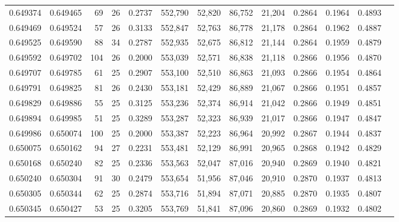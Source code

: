 \begin{tabular}{rrrrrrrrrrrrr}
0.649374 & 0.649465 &  69 &  26 &                                     0.2737 & 552,790 &  52,820 &  86,752 &  21,204 & 0.2864 & 0.1964 & 0.4893 \\
0.649469 & 0.649524 &  57 &  26 &                                     0.3133 & 552,847 &  52,763 &  86,778 &  21,178 & 0.2864 & 0.1962 & 0.4887 \\
0.649525 & 0.649590 &  88 &  34 &                                     0.2787 & 552,935 &  52,675 &  86,812 &  21,144 & 0.2864 & 0.1959 & 0.4879 \\
0.649592 & 0.649702 & 104 &  26 &                                     0.2000 & 553,039 &  52,571 &  86,838 &  21,118 & 0.2866 & 0.1956 & 0.4870 \\
0.649707 & 0.649785 &  61 &  25 &                                     0.2907 & 553,100 &  52,510 &  86,863 &  21,093 & 0.2866 & 0.1954 & 0.4864 \\
0.649791 & 0.649825 &  81 &  26 &                                     0.2430 & 553,181 &  52,429 &  86,889 &  21,067 & 0.2866 & 0.1951 & 0.4857 \\
0.649829 & 0.649886 &  55 &  25 &                                     0.3125 & 553,236 &  52,374 &  86,914 &  21,042 & 0.2866 & 0.1949 & 0.4851 \\
0.649894 & 0.649985 &  51 &  25 &                                     0.3289 & 553,287 &  52,323 &  86,939 &  21,017 & 0.2866 & 0.1947 & 0.4847 \\
0.649986 & 0.650074 & 100 &  25 &                                     0.2000 & 553,387 &  52,223 &  86,964 &  20,992 & 0.2867 & 0.1944 & 0.4837 \\
0.650075 & 0.650162 &  94 &  27 &                                     0.2231 & 553,481 &  52,129 &  86,991 &  20,965 & 0.2868 & 0.1942 & 0.4829 \\
0.650168 & 0.650240 &  82 &  25 &                                     0.2336 & 553,563 &  52,047 &  87,016 &  20,940 & 0.2869 & 0.1940 & 0.4821 \\
0.650240 & 0.650304 &  91 &  30 &                                     0.2479 & 553,654 &  51,956 &  87,046 &  20,910 & 0.2870 & 0.1937 & 0.4813 \\
0.650305 & 0.650344 &  62 &  25 &                                     0.2874 & 553,716 &  51,894 &  87,071 &  20,885 & 0.2870 & 0.1935 & 0.4807 \\
0.650345 & 0.650427 &  53 &  25 &                                     0.3205 & 553,769 &  51,841 &  87,096 &  20,860 & 0.2869 & 0.1932 & 0.4802 \\

\end{tabular}
